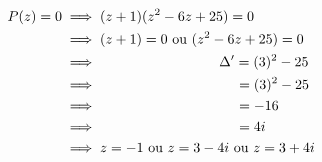 \documentclass[12pt,a4paper]{article}
\begin{document}
\begin{enumerate}
\begin{enumerate}
\( 
\begin{aligned}
P(z) = 0 &\implies (z+1)(z^{2}-6z+25) = 0\\
				 &\implies (z+1) = 0 \text{ ou }(z^{2}-6z+25) = 0\\
				 &\implies \hspace{3cm} \Delta' = (3)^{2}-25\\
				 &\implies \hspace{3.6cm}  				= (3)^{2}-25\\
				 &\implies \hspace{3.6cm}  				= -16\\
				 &\implies \hspace{3.6cm}  				= 4i\\
				 &\implies z=-1  \text{ ou } z = 3 - 4i \text{ ou } z = 3 + 4i
\end{aligned}
\)
    \end{enumerate}
\end{enumerate}
\end{document}
